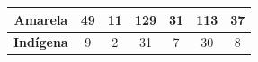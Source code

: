 \begin{table}[H]
{\begin{tabular}{c|cc|cc|cc|}
\multicolumn{1}{|c|}{\cellcolor[HTML]{C0C0C0}\textbf{Amarela}}           & \multicolumn{1}{c|}{49}                                      & 11                                        & \multicolumn{1}{c|}{129}                                     & 31                                        & \multicolumn{1}{c|}{113}                                     & 37                                        \\ \hline
\multicolumn{1}{|c|}{\cellcolor[HTML]{C0C0C0}\textbf{Indígena}}          & \multicolumn{1}{c|}{9}                                       & 2                                         & \multicolumn{1}{c|}{31}                                      & 7                                         & \multicolumn{1}{c|}{30}                                      & 8                                         \\ \hline
\end{tabular}%
}
\end{table}

